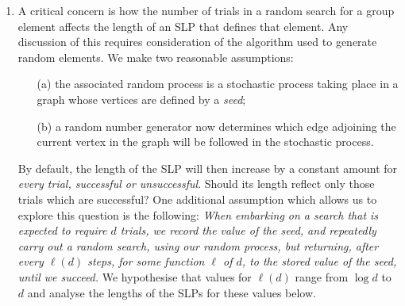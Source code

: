 \documentclass[12pt]{article}
\begin{document}
\begin{enumerate}
\item 
A critical concern is how the number of trials in a random search for 
a group element affects the length of an SLP that defines that element.  
Any discussion of this requires consideration of the algorithm
used to generate random elements.  We make two reasonable assumptions:
\begin{enumerate}
\item[(a)] the associated random process is a stochastic process taking place 
in a graph whose vertices are defined by a {\it seed};
\item[(b)] a random number generator now determines which 
edge adjoining the current vertex in the graph will be followed in 
the stochastic process.  
\end{enumerate}
By default, the length of the SLP will then increase by a constant amount 
for {\it every trial, successful or unsuccessful}.  
Should its length reflect only those trials which are successful? 
One additional assumption which allows us to explore this question is the following:
{\it When embarking on a search that is expected to require $d$ trials, 
we record the value of the seed, and repeatedly carry
out a random search, using our random process, but returning, after 
every $\ell (d)$ steps, for some function $\ell$ of $d$, to the 
stored value of the seed, until we succeed.}
We hypothesise that values for $\ell(d)$ range from $\log d$ to $d$ 
and analyse the lengths of the SLPs for these values below.
\end{enumerate}
\end{document}
